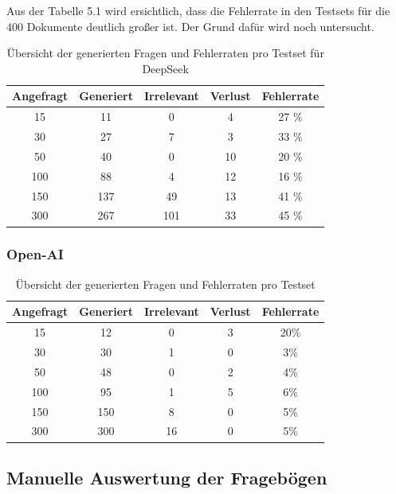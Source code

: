 Aus der Tabelle 5.1 wird ersichtlich, dass die Fehlerrate in den Testsets für die 400 Dokumente deutlich großer ist. Der Grund dafür wird noch untersucht.

\begin{table}[htbp]
    \centering
    \begin{tabular}{|c|c|c|c|c|}
        \hline
        \textbf{Angefragt} & \textbf{Generiert} & \textbf{Irrelevant} & \textbf{Verlust} & \textbf{Fehlerrate} \\
        \hline
        15   & 11  & 0   & 4  & 27 \% \\
        30   & 27  & 7   & 3  & 33 \% \\
        50   & 40  & 0   & 10 & 20 \% \\
        100  & 88  & 4   & 12 & 16 \% \\
        150  & 137 & 49  & 13 & 41 \% \\
        300  & 267 & 101 & 33 & 45 \% \\
        \hline
    \end{tabular}
    \caption{Übersicht der generierten Fragen und Fehlerraten pro Testset für DeepSeek}
\end{table}


\subsubsection{Open-AI}


\begin{table}[htbp]
    \centering
    \begin{tabular}{|c|c|c|c|c|}
        \hline
        \textbf{Angefragt} & \textbf{Generiert} & \textbf{Irrelevant} & \textbf{Verlust} & \textbf{Fehlerrate} \\
        \hline
        15   & 12   & 0   & 3  & 20\% \\
        30   & 30   & 1   & 0  & 3\%  \\
        50   & 48   & 0   & 2  & 4\%  \\
        100  & 95   & 1   & 5  & 6\%  \\
        150  & 150  & 8   & 0  & 5\%  \\
        300  & 300  & 16  & 0  & 5\%  \\
        \hline
    \end{tabular}
    \caption{Übersicht der generierten Fragen und Fehlerraten pro Testset}
\end{table}

\subsection{Manuelle Auswertung der Fragebögen}
